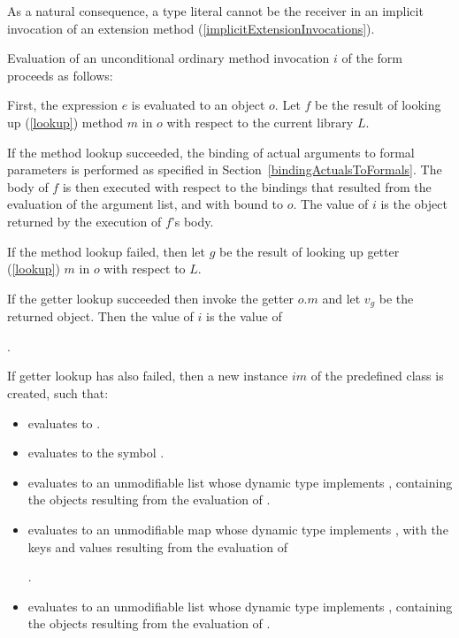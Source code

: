 \documentclass[makeidx]{article}
\begin{document}
{{As a natural consequence,
a type literal cannot be the receiver in
an implicit invocation of an extension method
(\ref{implicitExtensionInvocations}).%
}

\LMHash{}%
Evaluation of an unconditional ordinary method invocation $i$ of the form
%
proceeds as follows:

\LMHash{}%
%
First, the expression $e$ is evaluated to an object $o$.
Let $f$ be the result of looking up
(\ref{lookup})
method $m$ in $o$ with respect to the current library $L$.

\LMHash{}%
If the method lookup succeeded,
the binding of actual arguments to formal parameters is performed
as specified in Section~\ref{bindingActualsToFormals}.
The body of $f$ is then executed with respect to the bindings
that resulted from the evaluation of the argument list,
and with \THIS{} bound to $o$.
The value of $i$ is the object returned by the execution of $f$'s body.

\LMHash{}%
If the method lookup failed,
then let $g$ be the result of looking up getter
(\ref{lookup})
$m$ in $o$ with respect to $L$.

\LMHash{}%
If the getter lookup succeeded then invoke the getter $o.m$
and let $v_g$ be the returned object.
Then the value of $i$ is the value of

\noindent
{}.

\LMHash{}%
%
If getter lookup has also failed,
then a new instance $im$ of the predefined class  is created,
such that:
\begin{itemize}
\item {} evaluates to \TRUE.
\item {} evaluates to the symbol .
\item {} evaluates to an unmodifiable list
  whose dynamic type implements ,
  containing the objects resulting from the evaluation of
  .
\item {} evaluates to an unmodifiable map
  whose dynamic type implements ,
  with the keys and values resulting from the evaluation of

  .
\item {} evaluates to an unmodifiable list
  whose dynamic type implements ,
  containing the objects resulting from the evaluation of
  .
\end{itemize}

}
\end{document}
